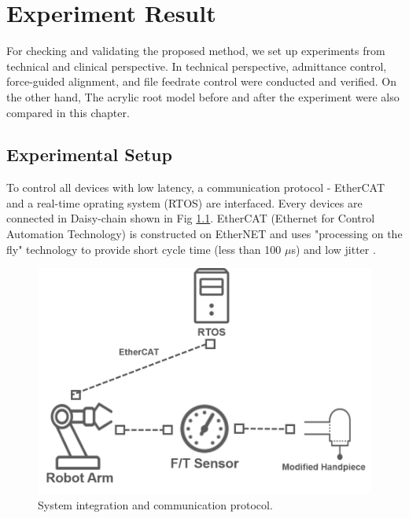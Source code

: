 \chapter{Experiment Result}
\hspace*{6mm}For checking and validating the proposed method, we set up experiments from technical and clinical perspective. In technical perspective, admittance control, force-guided alignment, and file feedrate control were conducted and verified. On the other hand, The acrylic root model before and after the experiment were also compared in this chapter. 
\section{Experimental Setup}
\hspace*{6mm}To control all devices with low latency, a communication protocol - EtherCAT and a real-time oprating system (RTOS) are interfaced. Every devices are connected in Daisy-chain shown in Fig \ref{fig:EtherCAT}. EtherCAT (Ethernet for Control Automation Technology) is constructed on EtherNET and uses "processing on the fly" technology to provide short cycle time (less than 100 $\mu$s) and low jitter \cite{web5}.
\begin{figure}[htbp]
\begin{center}
\includegraphics[width=0.7\linewidth]{Images/EtherCAT.png}
\caption{System integration and communication protocol.}
\label{fig:EtherCAT}
\end{center}
\end{figure}

